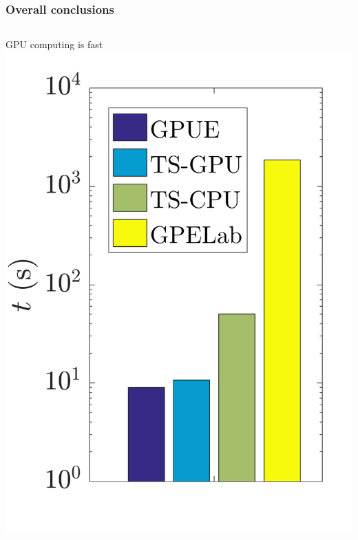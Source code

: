\documentclass{beamer}
\begin{document}
\begin{frame}
\frametitle{Overall conclusions}

\begin{columns}
GPU computing is fast
\includegraphics[width=\textwidth]{bench.png}
\end{columns}


\end{frame}
\end{document}
